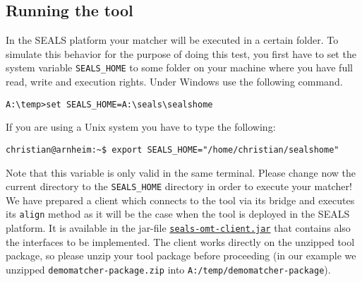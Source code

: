 \documentclass{article}
\begin{document}
\subsection{Running the tool}
\label{sub:test-running}

In the SEALS platform your matcher will be executed in a certain folder. To simulate this behavior for the purpose of doing this test, you first have to set the system variable \verb|SEALS_HOME| to some folder on your machine where you have full read, write and execution rights. Under Windows use the following command.
\begin{verbatim}
A:\temp>set SEALS_HOME=A:\seals\sealshome
\end{verbatim}
If you are using a Unix system you have to type the following:
\begin{verbatim}
christian@arnheim:~$ export SEALS_HOME="/home/christian/sealshome"
\end{verbatim}
Note that this variable is only valid in the same terminal. Please change now the current directory to the \verb|SEALS_HOME| directory in order to execute your matcher! We have prepared a client which connects to the tool via its bridge and executes its \verb|align| method as it will be the case when the tool is deployed in the SEALS platform. It is available in the jar-file \href{http://oaei.ontologymatching.org/2015/seals-omt-client.jar}{\nolinkurl{seals-omt-client.jar}} that contains also the interfaces to be implemented. The client works directly on the unzipped tool package, so please unzip your tool package before proceeding (in our example we unzipped \verb|demomatcher-package.zip| into \verb|A:/temp/demomatcher-package|).
\end{document}
